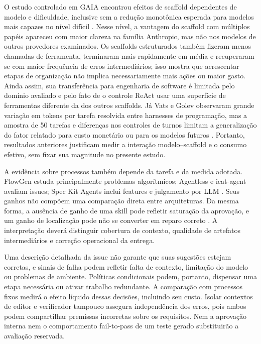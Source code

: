 O estudo controlado em GAIA encontrou efeitos de scaffold dependentes de modelo e dificuldade, inclusive sem a redução monotônica esperada para modelos mais capazes no nível difícil \cite{Starace2026ScaffoldGAIA}. Nesse nível, a vantagem do scaffold com múltiplos papéis apareceu com maior clareza na família Anthropic, mas não nos modelos de outros provedores examinados. Os scaffolds estruturados também fizeram menos chamadas de ferramenta, terminaram mais rapidamente em média e recuperaram-se com maior frequência de erros intermediários; isso mostra que acrescentar etapas de organização não implica necessariamente mais ações ou maior gasto. Ainda assim, sua transferência para engenharia de software é limitada pelo domínio avaliado e pelo fato de o controle ReAct usar uma superfície de ferramentas diferente da dos outros scaffolds. Já Vats e Golev observaram grande variação em tokens por tarefa resolvida entre harnesses de programação, mas a amostra de 50 tarefas e diferenças nos controles de turnos limitam a generalização do fator relatado para custo monetário ou para os modelos futuros \cite{Vats2026ScaffoldEffect}. Portanto, resultados anteriores justificam medir a interação modelo--scaffold e o consumo efetivo, sem fixar sua magnitude no presente estudo.

A evidência sobre processos também depende da tarefa e da medida adotada. FlowGen estuda principalmente problemas algorítmicos; Agentless e icat-agent avaliam issues; Spec Kit Agents inclui features e julgamento por LLM \cite{Lin2024FlowGen,Xia2024Agentless,Chen2026IcatAgent,Taghavi2026SpecKitAgents}. Seus ganhos não compõem uma comparação direta entre arquiteturas. Da mesma forma, a ausência de ganho de uma skill pode refletir saturação da aprovação, e um ganho de localização pode não se converter em reparo correto \cite{Han2026SWESkills,Jiang2025LCLM}. A interpretação deverá distinguir cobertura de contexto, qualidade de artefatos intermediários e correção operacional da entrega.

Uma descrição detalhada da issue não garante que suas sugestões estejam corretas, e sinais de falha podem refletir falta de contexto, limitação do modelo ou problemas de ambiente. Políticas condicionais podem, portanto, dispensar uma etapa necessária ou ativar trabalho redundante. A comparação com processos fixos medirá o efeito líquido dessas decisões, incluindo seu custo. Isolar contextos de editor e verificador tampouco assegura independência dos erros, pois ambos podem compartilhar premissas incorretas sobre os requisitos. Nem a aprovação interna nem o comportamento fail-to-pass de um teste gerado substituirão a avaliação reservada.

